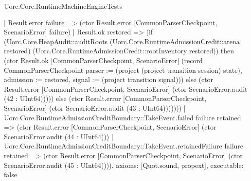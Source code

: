 \begin{lexlean}{Uorc.Core.RuntimeMachineEngineTests}
\begin{semanticmodule}
{        | Result.error failure => (ctor Result.error [CommonParserCheckpoint, ScenarioError] failure)
        | Result.ok restored => (if (Uorc.Core.HeapAudit::auditRoots (Uorc.Core.RuntimeAdmissionCredit::arena restored) (Uorc.Core.RuntimeAdmissionCredit::rootInventory restored)) then (ctor Result.ok [CommonParserCheckpoint, ScenarioError] (record CommonParserCheckpoint {parser := (project (project transition session) state), admission := restored, signal := (project transition signal)})) else (ctor Result.error [CommonParserCheckpoint, ScenarioError] (ctor ScenarioError.audit (42 : UInt64))))) else (ctor Result.error [CommonParserCheckpoint, ScenarioError] (ctor ScenarioError.audit (43 : UInt64)))))))
    | Uorc.Core.RuntimeAdmissionCreditBoundary::TakeEvent.failed failure retained => (ctor Result.error [CommonParserCheckpoint, ScenarioError] (ctor ScenarioError.audit (44 : UInt64)))
    | Uorc.Core.RuntimeAdmissionCreditBoundary::TakeEvent.retainedFailure failure retained => (ctor Result.error [CommonParserCheckpoint, ScenarioError] (ctor ScenarioError.audit (45 : UInt64)))),
  axioms: [Quot.sound, propext],
  executable: false
}


\end{semanticmodule}
\end{lexlean}

